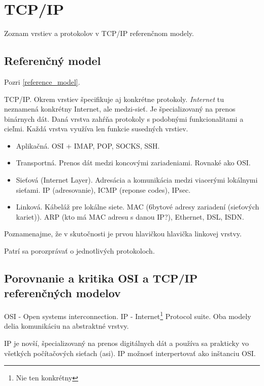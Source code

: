 \documentclass[10pt,a4paper]{article}
\begin{document}
\section{TCP/IP}       
Zoznam vrstiev a protokolov v TCP/IP referenčnom modely. 
   
\subsection{Referenčný model}        
Pozri \ref{reference_model}.

TCP/IP. Okrem vrstiev špecifikuje aj konkrétne protokoly. \emph{Internet} tu neznamená konkrétny Internet, ale medzi-sieť. Je špecializovaný na prenos binárnych dát. 
Daná vrstva zahŕňa protokoly s podobnými funkcionalitami a cieľmi. Každá vrstva využíva len funkcie susedných vrstiev. 
 
\begin{itemize}
\item Aplikačná. OSI + IMAP, POP, SOCKS, SSH.            
\item Transportná. Prenos dát medzi koncovými zariadeniami. Rovnaké ako OSI.     
\item Sieťová (Internet Layer). Adresácia a komunikácia medzi viacerými lokálnymi sieťami. IP (adresovanie), ICMP (reponse codes), IPsec.      
\item Linková. Kábeláž pre lokálne siete. MAC (6bytové adresy zariadení (sieťových kariet)). ARP (kto má MAC adresu s danou IP?), Ethernet, DSL, ISDN.      
\end{itemize}

Poznamenajme, že v skutočnosti je prvou hlavičkou hlavička linkovej vrstvy. 

Patrí sa porozprávať o jednotlivých protokoloch. 

\subsection{Porovnanie a kritika OSI a TCP/IP referenčných modelov}    

OSI - Open systems interconnection. IP - Internet\footnote{Nie ten konkrétny} Protocol suite. Oba modely delia komunikáciu na abstraktné vrstvy. 

IP je novší, špecializovaný na prenos digitálnych dát a používa sa prakticky vo všetkých počítačových sieťach (asi).
IP možnosť interpertovať ako inštanciu OSI.  
\end{document}
